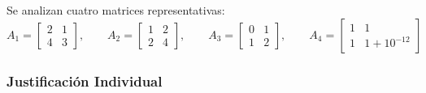 \documentclass[11pt,a4paper]{article}
\theoremstyle{definition}
\theoremstyle{remark}
\begin{document}
Se analizan cuatro matrices representativas:
\begin{equation}
    A_1 = \begin{bmatrix} 2 & 1 \\ 4 & 3 \end{bmatrix}, \qquad
    A_2 = \begin{bmatrix} 1 & 2 \\ 2 & 4 \end{bmatrix}, \qquad
    A_3 = \begin{bmatrix} 0 & 1 \\ 1 & 2 \end{bmatrix}, \qquad
    A_4 = \begin{bmatrix} 1 & 1 \\ 1 & 1 + 10^{-12} \end{bmatrix}
\end{equation}

\subsubsection{Justificación Individual}
\end{document}

